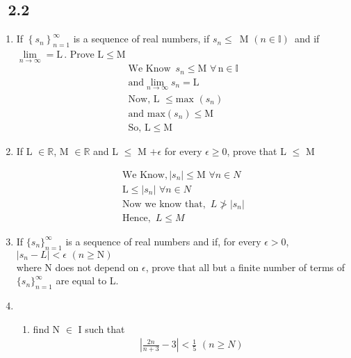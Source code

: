 \documentclass[11pt, letterpaper]{article}
\begin{document}
\subsection{\exr \, 2.2}
\begin{enumerate}
	\item{If $\left\lbrace s_n\right\rbrace_{n=1}^\infty$ is a sequence of real 		numbers, if $s_n \leqslant \,$ M $(n \in \mathbb{I}) \,$ and if $\lim \limits_{n \to \infty} = \mathrm{L} \,$. Prove $\mathrm{L} \leqslant \mathrm{M}$\\
	
	\begin{align*}
	\mathrm{We \,\, Know \,\,\,} s_n \leqslant \mathrm{M} \,\, \forall\, \mathrm{n} \in \mathbb{I}\\
	\mathrm{and} \lim \limits_{n \to \infty} s_n = \mathrm{L}\\
	\mathrm{Now, \, L\,\, } \leqslant \mathrm{max\,\,} \left(s_n\right)\\
	\mathrm{and \,\,} \mathrm{max} \left(s_n \right) \leqslant \mathrm{M}\\
	\mathrm{So, \, L } \leqslant \mathrm{M}
	\end{align*}
	}
	
	\item {If L $\in \mathbb{R}$, M $\in \mathbb{R}$ and L $\leq$ M $+ \epsilon$ for every $\epsilon \geq 0$, prove that L $\leq$ M 
	
	\begin{align*}	
		\mathrm{We \,\, Know,} \left| s_n \right| \leq \mathrm{M}\,\, \forall n \in N\\
		\mathrm{L} \leq \left| s_n \right| \,\, \forall n \in N\\
		\mathrm{Now \,\, we \,\, know \,\, that, \,\,} L \ngtr \left| s_n \right| \\
		\mathrm{Hence, \,\,} L \leq M 
	\end{align*}
	}
	
	\item{
		If $\lbrace s_n \rbrace_{n=1}^\infty$ is a sequence of real numbers and if, for every $		\epsilon > 0$,\\
		$\left| s_n - L \right| < \epsilon \,\, (n \geq \mathrm{N})$\\
		where N does not depend on $\epsilon$, prove that all but a finite number of terms of $\lbrace s_n \rbrace_{n=1}^\infty$ are equal to L.		
	}
	
	\item{
		\begin{enumerate}
			\item{find N $\in$ I such that\\
				\begin{align*}
					\left|\frac{2n}{n + 3} - 3\right| < \frac{1}{5} \,\, (n \geq N)					
				\end{align*}	
				
}
\end{enumerate}}
\end{enumerate}
\end{document}
